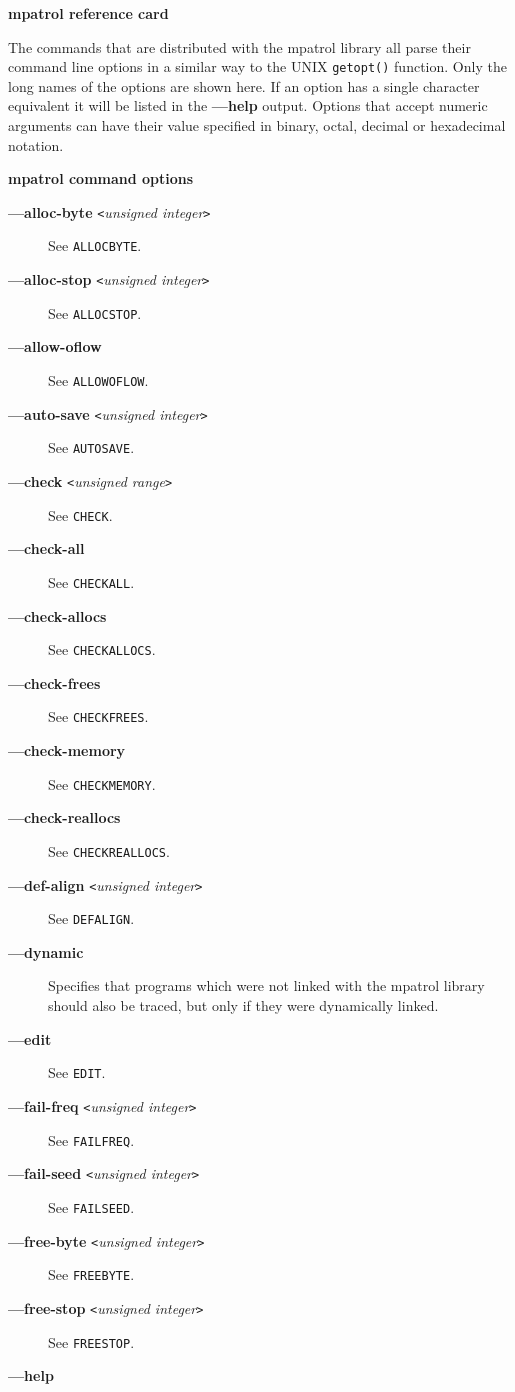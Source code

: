 \documentclass[a4paper,landscape,final]{article}
\newcommand{\heading}[1]{\textbf{\normalsize #1}}
\newcommand{\function}[1]{\texttt{#1()}}
\newcommand{\flag}[1]{\textbf{---#1}}
\newcommand{\flagpar}[2]{\flag{#1} \texttt{<}\textit{#2}\texttt{>}}
\newcommand{\option}[1]{\texttt{#1}}
\begin{document}
\begin{multicols}{3}{\textbf{\Large mpatrol reference card}}
\vskip 12pt

The commands that are distributed with the mpatrol library all parse their
command line options in a similar way to the UNIX \function{getopt} function.
Only the long names of the options are shown here.  If an option has a single
character equivalent it will be listed in the \flag{help} output.  Options that
accept numeric arguments can have their value specified in binary, octal,
decimal or hexadecimal notation.

\vskip 12pt
\heading{mpatrol command options}
\vskip 6pt

\begin{description}
\item[\flagpar{alloc-byte}{unsigned integer}]
\hfill See \option{ALLOCBYTE}.
\item[\flagpar{alloc-stop}{unsigned integer}]
\hfill See \option{ALLOCSTOP}.
\item[\flag{allow-oflow}]
\hfill See \option{ALLOWOFLOW}.
\item[\flagpar{auto-save}{unsigned integer}]
\hfill See \option{AUTOSAVE}.
\item[\flagpar{check}{unsigned range}]
\hfill See \option{CHECK}.
\item[\flag{check-all}]
\hfill See \option{CHECKALL}.
\item[\flag{check-allocs}]
\hfill See \option{CHECKALLOCS}.
\item[\flag{check-frees}]
\hfill See \option{CHECKFREES}.
\item[\flag{check-memory}]
\hfill See \option{CHECKMEMORY}.
\item[\flag{check-reallocs}]
\hfill See \option{CHECKREALLOCS}.
\item[\flagpar{def-align}{unsigned integer}]
\hfill See \option{DEFALIGN}.
\item[\flag{dynamic}]
Specifies that programs which were not linked with the mpatrol library should
also be traced, but only if they were dynamically linked.
\item[\flag{edit}]
\hfill See \option{EDIT}.
\item[\flagpar{fail-freq}{unsigned integer}]
\hfill See \option{FAILFREQ}.
\item[\flagpar{fail-seed}{unsigned integer}]
\hfill See \option{FAILSEED}.
\item[\flagpar{free-byte}{unsigned integer}]
\hfill See \option{FREEBYTE}.
\item[\flagpar{free-stop}{unsigned integer}]
\hfill See \option{FREESTOP}.
\item[\flag{help}]

\end{description}
\end{multicols}
\end{document}
